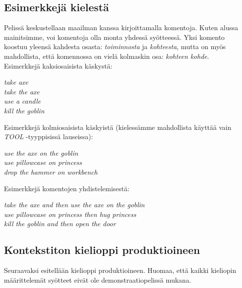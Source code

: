 \documentclass[a4paper,12pt,finnish]{article}
\begin{document}
\subsection {Esimerkkejä kielestä}
Pelissä keskustellaan maailman kanssa kirjoittamalla komentoja. Kuten alussa mainitsimme, voi komentoja olla monta
yhdessä syötteessä. Yksi komento koostuu yleensä kahdesta osasta: \textit{toiminnosta} ja \textit{kohteesta}, mutta on myös mahdollista, että komennossa on vielä kolmaskin osa: \textit{kohteen kohde}. \\ \newline Esimerkkejä kaksiosaisista käskystä:
  \begin{flushleft}
 \textit{take axe} \\
 \textit{take the axe} \\
\textit{use a candle } \\
\textit{kill the goblin} \\
\end{flushleft} 
 Esimerkkejä kolmiosaisista käskyistä (kielessämme mahdollista käyttää vain \textit{TOOL} -tyyppisissä lauseissa):

  \begin{flushleft}
 \textit{use the axe on the goblin} \\
 \textit{use pillowcase on princess } \\
\textit{drop the hammer on workbench } \\
\end{flushleft}
 Esimerkkejä komentojen yhdistelemisestä:
  \begin{flushleft}
 \textit{take the axe and then use the axe on the goblin} \\
 \textit{use pillowcase on princess then hug princess } \\
\textit{kill the goblin and then open the door } \\
\end{flushleft}
\newpage
\subsection {Kontekstiton kielioppi produktioineen}
 Seuraavaksi esitellään kielioppi produktioineen. Huomaa, että kaikki kieliopin määrittelemät syötteet
eivät ole demonstraatiopelissä mukana.
\end{document}
